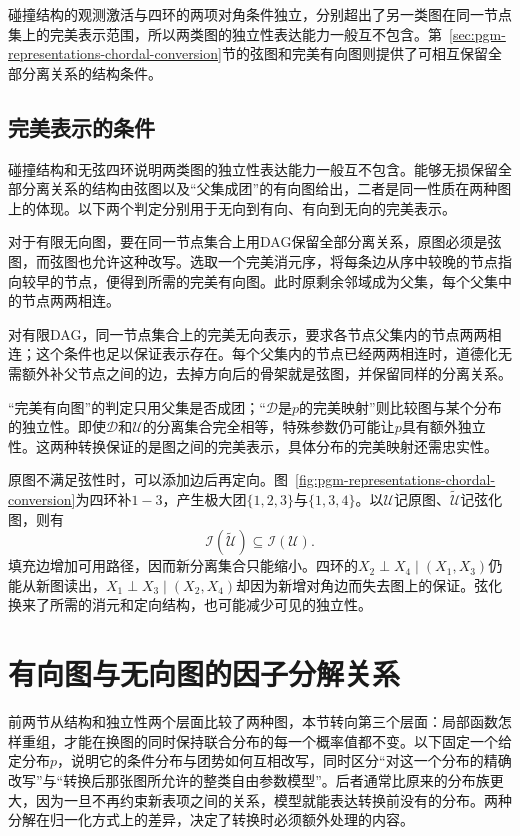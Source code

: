 碰撞结构的观测激活与四环的两项对角条件独立，分别超出了另一类图在同一节点集上的完美表示范围，所以两类图的独立性表达能力一般互不包含。第~\ref{sec:pgm-representations-chordal-conversion}节的弦图和完美有向图则提供了可相互保留全部分离关系的结构条件。

\subsection{完美表示的条件}
\label{sec:pgm-representations-perfect-dags}

碰撞结构和无弦四环说明两类图的独立性表达能力一般互不包含。能够无损保留全部分离关系的结构由弦图以及“父集成团”的有向图给出，二者是同一性质在两种图上的体现。以下两个判定分别用于无向到有向、有向到无向的完美表示。

对于有限无向图，要在同一节点集合上用DAG保留全部分离关系，原图必须是弦图，而弦图也允许这种改写。选取一个完美消元序，将每条边从序中较晚的节点指向较早的节点，便得到所需的完美有向图。此时原剩余邻域成为父集，每个父集中的节点两两相连。


对有限DAG，同一节点集合上的完美无向表示，要求各节点父集内的节点两两相连；这个条件也足以保证表示存在。每个父集内的节点已经两两相连时，道德化无需额外补父节点之间的边，去掉方向后的骨架就是弦图，并保留同样的分离关系。

“完美有向图”的判定只用父集是否成团；“$\mathcal{D}$是$p$的完美映射”则比较图与某个分布的独立性。即使$\mathcal{D}$和$\mathcal{U}$的分离集合完全相等，特殊参数仍可能让$p$具有额外独立性。这两种转换保证的是图之间的完美表示，具体分布的完美映射还需忠实性。

原图不满足弦性时，可以添加边后再定向。图~\ref{fig:pgm-representations-chordal-conversion}为四环补$1-3$，产生极大团$\{1,2,3\}$与$\{1,3,4\}$。以$\mathcal{U}$记原图、$\widetilde{\mathcal{U}}$记弦化图，则有
\[
  \mathcal{I}(\widetilde{\mathcal{U}})
  \subseteq \mathcal{I}(\mathcal{U}).
\]
填充边增加可用路径，因而新分离集合只能缩小。四环的$X_2\perp X_4\mid(X_1,X_3)$仍能从新图读出，$X_1\perp X_3\mid(X_2,X_4)$却因为新增对角边而失去图上的保证。弦化换来了所需的消元和定向结构，也可能减少可见的独立性。

\section{有向图与无向图的因子分解关系}
\label{sec:pgm-representations-factorizations}

前两节从结构和独立性两个层面比较了两种图，本节转向第三个层面：局部函数怎样重组，才能在换图的同时保持联合分布的每一个概率值都不变。以下固定一个给定分布$p$，说明它的条件分布与团势如何互相改写，同时区分“对这一个分布的精确改写”与“转换后那张图所允许的整类自由参数模型”。后者通常比原来的分布族更大，因为一旦不再约束新表项之间的关系，模型就能表达转换前没有的分布。两种分解在归一化方式上的差异，决定了转换时必须额外处理的内容。

